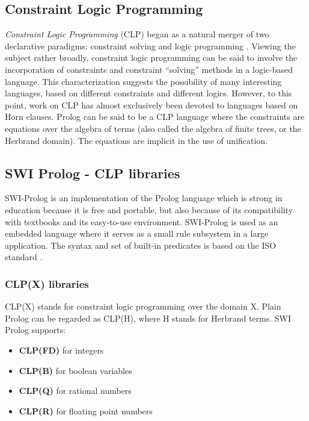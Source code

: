 \subsection{Constraint Logic Programming}\label{subsec:clp}

\textit{Constraint Logic Programming} (CLP) began as a natural merger of two declarative paradigms: constraint solving and logic programming \cite{JAFFAR1994503}.\newline
Viewing the subject rather broadly, constraint logic programming can be said to involve the
incorporation of constraints and constraint “solving” methods in a logic-based language.
This characterization suggests the possibility of many interesting languages, based on different constraints and different logics. However, to this point, work on CLP has almost
exclusively been devoted to languages based on Horn clauses.\newline
Prolog can be said to be a CLP language where the constraints are equations over the
algebra of terms (also called the algebra of finite trees, or the Herbrand domain). The equations are implicit in the use of unification.

\subsection{SWI Prolog - CLP libraries}\label{subsec:clp_swi}

SWI-Prolog is an implementation of the Prolog language which is strong in education because it is free and portable, but also because of its compatibility with textbooks and its easy-to-use environment.\newline
SWI-Prolog is used as an embedded language where it serves as a small rule subsystem in a large application. The syntax and set of built-in predicates is based on the ISO standard \cite{SWI-Prolog}.

\subsubsection{CLP(X) libraries}\label{subsubsec:clp_libraries}
CLP(X) stands for constraint logic programming over the domain X. Plain Prolog can be regarded as CLP(H), where H stands for Herbrand terms.\newline
SWI Prolog supports:\newline
\begin{itemize}
    \item \textbf{CLP(FD)} for integers
    \item \textbf{CLP(B)} for boolean variables
    \item \textbf{CLP(Q)} for rational numbers
    \item \textbf{CLP(R)} for floating point numbers
\end{itemize}

